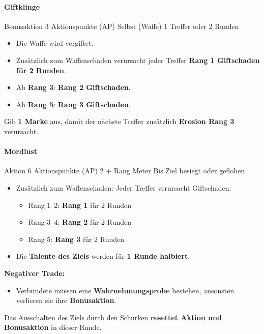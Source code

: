 \paragraph*{Giftklinge}
\skillcard
{}
{Bonusaktion}
{3 Aktionspunkte (AP)}
{Selbst (Waffe)}
{1 Treffer oder 2 Runden}
{
	\begin{itemize}
		\item Die Waffe wird vergiftet.
		\item Zusätzlich zum Waffenschaden verursacht jeder Treffer
		\textbf{Rang 1 Giftschaden für 2 Runden}.
		\item Ab \textbf{Rang 3}: \textbf{Rang 2 Giftschaden}.
		\item Ab \textbf{Rang 5}: \textbf{Rang 3 Giftschaden}.
	\end{itemize}
}
{
	Gib \textbf{1 Marke} aus, damit der nächste Treffer zusätzlich
	\textbf{Erosion Rang 3} verursacht.
}

\paragraph*{Mordlust}
\skillcard
{}
{Aktion}
{6 Aktionspunkte (AP)}
{2 + Rang Meter}
{Bis Ziel besiegt oder geflohen}
{
	\begin{itemize}
		\item Zusätzlich zum Waffenschaden:
		Jeder Treffer verursacht Giftschaden:
		\begin{itemize}
			\item Rang 1--2: \textbf{Rang 1} für 2 Runden
			\item Rang 3--4: \textbf{Rang 2} für 2 Runden
			\item Rang 5: \textbf{Rang 3} für 2 Runden
		\end{itemize}
		\item Die \textbf{Talente des Ziels} werden für \textbf{1 Runde halbiert}.
	\end{itemize}
	
	\textbf{Negativer Trade:}
	\begin{itemize}
		\item Verbündete müssen eine \textbf{Wahrnehmungsprobe} bestehen,
		ansonsten verlieren sie ihre \textbf{Bonusaktion}.
	\end{itemize}
}
{
	Das Ausschalten des Ziels durch den Schurken
	\textbf{resettet Aktion und Bonusaktion} in dieser Runde.
}

